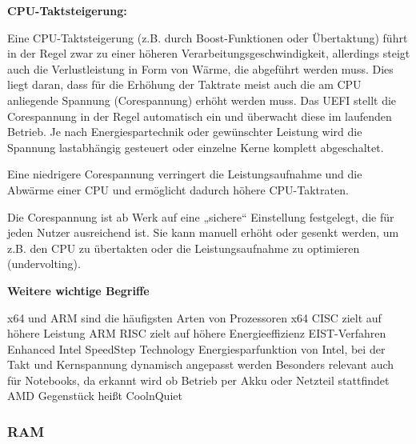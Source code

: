 \documentclass[asp1.tex]{subfiles}
\begin{document}
\textbf{CPU-Taktsteigerung:}
\begin{outline}
    \1 Eine CPU-Taktsteigerung (z.B. durch Boost-Funktionen oder Übertaktung) führt in der Regel zwar zu einer höheren Verarbeitungsgeschwindigkeit, allerdings steigt auch die Verlustleistung in Form von Wärme, die abgeführt werden muss. Dies liegt daran, dass für die Erhöhung der Taktrate meist auch die am CPU anliegende Spannung (Corespannung) erhöht werden muss. Das UEFI stellt die Corespannung in der Regel automatisch ein und überwacht diese im laufenden Betrieb. Je nach Energiespartechnik oder gewünschter Leistung wird die Spannung lastabhängig gesteuert oder einzelne Kerne komplett abgeschaltet.

    \1 Eine niedrigere Corespannung verringert die Leistungsaufnahme und die Abwärme einer CPU und ermöglicht dadurch höhere CPU-Taktraten.

    \1 Die Corespannung ist ab Werk auf eine „sichere“ Einstellung festgelegt, die für jeden Nutzer ausreichend ist. Sie kann manuell erhöht oder gesenkt werden, um z.B. den CPU zu übertakten oder die Leistungsaufnahme zu optimieren (undervolting).
\end{outline}

\textbf{Weitere wichtige Begriffe}
\begin{outline}
    \1 x64 und ARM sind die häufigsten Arten von Prozessoren
    \2 x64 \textrightarrow\space CISC \textrightarrow\space zielt auf höhere Leistung
    \2 ARM \textrightarrow\space RISC \textrightarrow\space zielt auf höhere Energieeffizienz
    \1 EIST-Verfahren
    \2 Enhanced Intel SpeedStep Technology
    \2 Energiesparfunktion von Intel, bei der Takt und Kernspannung dynamisch angepasst werden
    \2 Besonders relevant auch für Notebooks, da erkannt wird ob Betrieb per Akku oder Netzteil stattfindet
    \2 AMD Gegenstück heißt CoolnQuiet
\end{outline}

\subsubsection{RAM}
\end{document}
